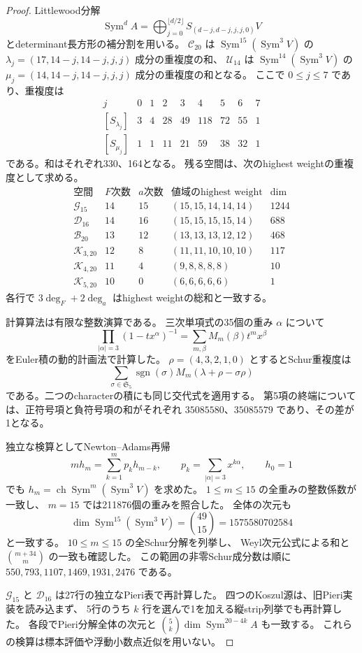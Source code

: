 \begin{proof}
Littlewood分解
\[
\operatorname{Sym}^d A=
 \bigoplus_{j=0}^{\lfloor d/2\rfloor}S_{(d-j,d-j,j,j,0)}V
\]
とdeterminant長方形の補分割を用いる。
$\mathcal C_{20}$ は $\operatorname{Sym}^{15}(\operatorname{Sym}^3V)$ の
$\lambda_j=(17,14-j,14-j,j,j)$ 成分の重複度の和、
$\mathcal U_{14}$ は $\operatorname{Sym}^{14}(\operatorname{Sym}^3V)$ の
$\mu_j=(14,14-j,14-j,j,j)$ 成分の重複度の和となる。
ここで $0\le j\le7$ であり、重複度は
\[
\begin{array}{c|rrrrrrrr}
j&0&1&2&3&4&5&6&7\\\hline
[S_{\lambda_j}]&3&4&28&49&118&72&55&1\\
{}[S_{\mu_j}]&1&1&11&21&59&38&32&1
\end{array}
\]
である。和はそれぞれ330、164となる。
残る空間は、次のhighest weightの重複度として求める。
\[
\begin{array}{c|rr|c|r}
\text{空間}&F\text{次数}&a\text{次数}&\text{値域のhighest weight}&\dim\\\hline
\mathcal G_{15}&14&15&(15,15,14,14,14)&1244\\
\mathcal D_{16}&14&16&(15,15,15,15,14)&688\\
\mathcal B_{20}&13&12&(13,13,13,12,12)&468\\
\mathcal K_{3,20}&12&8&(11,11,10,10,10)&117\\
\mathcal K_{4,20}&11&4&(9,8,8,8,8)&10\\
\mathcal K_{5,20}&10&0&(6,6,6,6,6)&1
\end{array}
\]
各行で $3\deg_F+2\deg_a$ はhighest weightの総和と一致する。

計算算法は有限な整数演算である。
三次単項式の35個の重み $\alpha$ について
\[
 \prod_{|\alpha|=3}(1-tx^\alpha)^{-1}
  =\sum_{m,\beta}M_m(\beta)t^mx^\beta
\]
をEuler積の動的計画法で計算した。
$\rho=(4,3,2,1,0)$ とするとSchur重複度は
\[
 \sum_{\sigma\in\mathfrak S_5}\operatorname{sgn}(\sigma)
 M_m(\lambda+\rho-\sigma\rho)
\]
である。二つのcharacterの積にも同じ交代式を適用する。
第5項の終端については、正符号項と負符号項の和がそれぞれ
$35085580$、$35085579$ であり、その差が1となる。

独立な検算としてNewton--Adams再帰
\[
 mh_m=\sum_{k=1}^m p_kh_{m-k},\qquad
 p_k=\sum_{|\alpha|=3}x^{k\alpha},\qquad h_0=1
\]
でも $h_m=\operatorname{ch}\operatorname{Sym}^m(\operatorname{Sym}^3V)$ を求めた。
$1\le m\le15$ の全重みの整数係数が一致し、
$m=15$ では211876個の重みを照合した。
全体の次元も
\[
 \dim\operatorname{Sym}^{15}(\operatorname{Sym}^3V)
 =\binom{49}{15}=1575580702584
\]
と一致する。
$10\le m\le15$ の全Schur分解を列挙し、
Weyl次元公式による和と $\binom{m+34}{m}$ の一致も確認した。
この範囲の非零Schur成分数は順に
$550,793,1107,1469,1931,2476$ である。

$\mathcal G_{15}$ と $\mathcal D_{16}$ は27行の独立なPieri表で再計算した。
四つのKoszul源は、旧Pieri実装を読み込まず、
5行のうち $k$ 行を選んで1を加える縦strip列挙でも再計算した。
各段でPieri分解全体の次元と
$\binom5k\dim\operatorname{Sym}^{20-4k}A$ も一致する。
これらの検算は標本評価や浮動小数点近似を用いない。
\end{proof}

